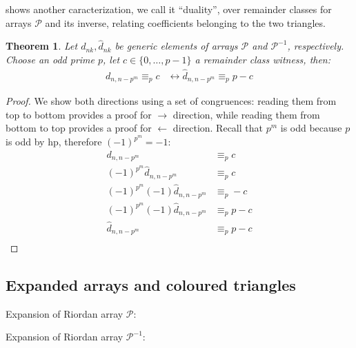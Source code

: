 \documentclass[10pt,a4paper]{article} %
\newtheorem{theorem}{Theorem}[section]
\begin{document}
    shows another caracterization, we call it ``duality'', 
    over remainder classes for arrays $\mathcal{P}$ and its inverse, relating coefficients
    belonging to the two triangles.
    \begin{theorem}
        Let $d_{nk}, \hat{d}_{nk}$ be generic elements of arrays $\mathcal{P}$ and $\mathcal{P}^{-1}$,
        respectively. Choose an odd prime $p$, let $c\in \lbrace 0, \ldots, p-1 \rbrace$ a remainder class
        witness, then:
        \begin{displaymath}
            \begin{split}
                d_{n,n-p^{m}} \equiv_{p} c &\leftrightarrow \hat{d}_{n,n-p^{m}} \equiv_{p} p-c
            \end{split}
        \end{displaymath}
    \end{theorem}
    \begin{proof}
    We show both directions using a set of congruences: reading them from top to bottom provides a 
    proof for $\rightarrow$ direction, while reading them from bottom to top provides a proof for 
    $\leftarrow$ direction. Recall that $p^m$ is odd because $p$ is odd by hp, therefore $(-1)^{p^m} = -1$:
    \begin{displaymath}
        \begin{split}
            d_{n,n-p^{m}} &\equiv_{p} c \\
            (-1)^{p^m}\hat{d}_{n,n-p^{m}} &\equiv_{p} c \\
            (-1)^{p^m }(-1)\hat{d}_{n,n-p^{m}} &\equiv_{p} -c \\
            (-1)^{p^m }(-1)\hat{d}_{n,n-p^{m}} &\equiv_{p} p -c \\
            \hat{d}_{n,n-p^{m}} &\equiv_{p} p -c \\
        \end{split}
    \end{displaymath}
    \end{proof}


    \subsection{Expanded arrays and coloured triangles}

    Expansion of Riordan array $\mathcal{P}$:
    
    Expansion of Riordan array $\mathcal{P}^{-1}$:
    
\end{document}
